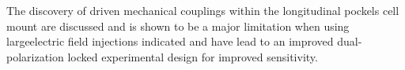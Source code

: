 The discovery of driven mechanical couplings within the longitudinal pockels cell mount are discussed and is shown to be a major limitation when using large\textcolor{(Mention how large)} electric field injections indicated and have lead to an improved dual-polarization locked experimental design for improved sensitivity.
